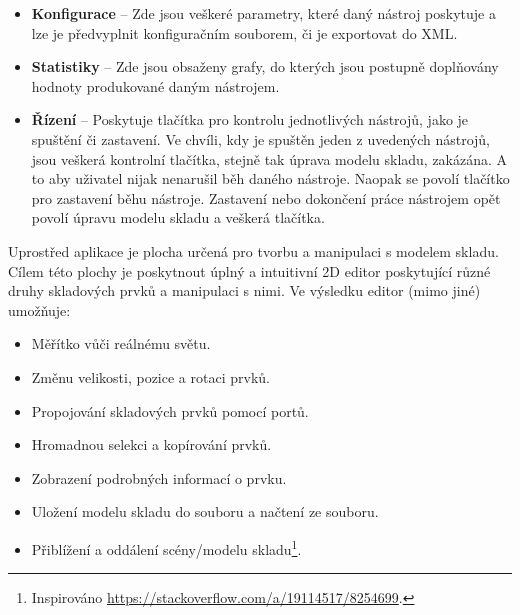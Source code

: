 \begin{itemize}
    \item \textbf{Konfigurace} -- Zde jsou veškeré parametry, které daný nástroj poskytuje a lze je předvyplnit konfiguračním souborem, či je exportovat do XML.
    \item \textbf{Statistiky} -- Zde jsou obsaženy grafy, do kterých jsou postupně doplňovány hodnoty produkované daným nástrojem.
    \item \textbf{Řízení} -- Poskytuje tlačítka pro kontrolu jednotlivých nástrojů, jako je spuštění či zastavení. Ve chvíli, kdy je spuštěn jeden z uvedených nástrojů, jsou veškerá kontrolní tlačítka, stejně tak úprava modelu skladu, zakázána. A to aby uživatel nijak nenarušil běh daného nástroje. Naopak se povolí tlačítko pro zastavení běhu nástroje. Zastavení nebo dokončení práce nástrojem opět povolí úpravu modelu skladu a veškerá tlačítka.
\end{itemize}

Uprostřed aplikace je plocha určená pro tvorbu a manipulaci s modelem skladu. Cílem této plochy je poskytnout úplný a intuitivní 2D editor poskytující různé druhy skladových prvků a manipulaci s nimi. Ve výsledku editor (mimo jiné) umožňuje:

\begin{itemize}
    \item Měřítko vůči reálnému světu.
    \item Změnu velikosti, pozice a rotaci prvků.
    \item Propojování skladových prvků pomocí portů.
    \item Hromadnou selekci a kopírování prvků.
    \item Zobrazení podrobných informací o prvku.
    \item Uložení modelu skladu do souboru a načtení ze souboru.
    \item Přiblížení a oddálení scény/modelu skladu\footnote{Inspirováno \url{https://stackoverflow.com/a/19114517/8254699}.}.
\end{itemize}

